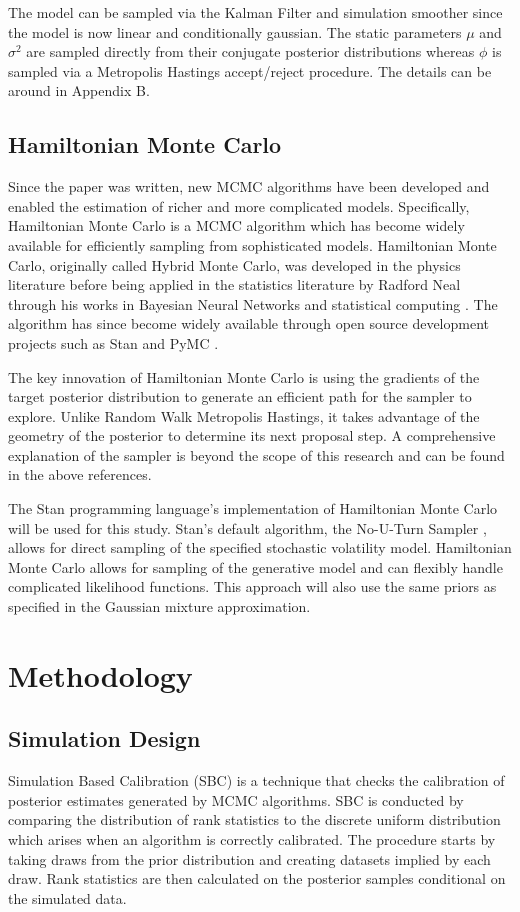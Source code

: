 \documentclass[12pt, a4paper]{article}
\begin{document}
        The model can be sampled via the Kalman Filter and simulation smoother since the model is now linear and conditionally gaussian. The static parameters $\mu$ and $\sigma^2$ are sampled directly from their conjugate posterior distributions whereas $\phi$ is sampled via a Metropolis Hastings accept/reject procedure. The details can be around in Appendix B. 

    \subsection{Hamiltonian Monte Carlo}
        Since the paper was written, new MCMC algorithms have been developed and enabled the estimation of richer and more complicated models. Specifically, Hamiltonian Monte Carlo is a MCMC algorithm which has become widely available for efficiently sampling from sophisticated models. Hamiltonian Monte Carlo, originally called Hybrid Monte Carlo, was developed in the physics literature \citep{duane1987hybrid} before being applied in the statistics literature by Radford Neal through his works in Bayesian Neural Networks \citep{neal1995bayesian} and statistical computing \citep{neal2011mcmc}. The algorithm has since become widely available through open source development projects such as Stan \citep{stan} and PyMC \citep{pymc2023}.

        The key innovation of Hamiltonian Monte Carlo is using the gradients of the target posterior distribution to generate an efficient path for the sampler to explore. Unlike Random Walk Metropolis Hastings, it takes advantage of the geometry of the posterior to determine its next proposal step. A comprehensive explanation of the sampler is beyond the scope of this research and can be found in the above references. 

        The Stan programming language's implementation of Hamiltonian Monte Carlo will be used for this study. Stan's default algorithm, the No-U-Turn Sampler \citep{hoffman2014no}, allows for direct sampling of the specified stochastic volatility model. Hamiltonian Monte Carlo allows for sampling of the generative model and can flexibly handle complicated likelihood functions. This approach will also use the same priors as specified in the Gaussian mixture approximation.


\section{Methodology}

    \subsection{Simulation Design}
        Simulation Based Calibration (SBC) is a technique that checks the calibration of posterior estimates generated by MCMC algorithms. SBC is conducted by comparing the distribution of rank statistics to the discrete uniform distribution which arises when an algorithm is correctly calibrated. The procedure starts by taking draws from the prior distribution and creating datasets implied by each draw. Rank statistics are then calculated on the posterior samples conditional on the simulated data. 
\end{document}

